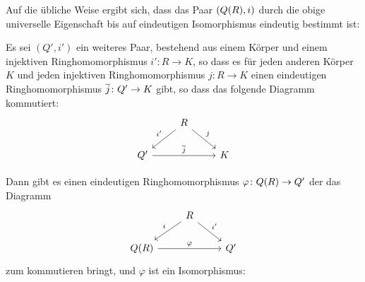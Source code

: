 \begin{remark}
  Auf die übliche Weise ergibt sich, dass das Paar $(Q(R), i)$ durch die obige universelle Eigenschaft bis auf eindeutigen Isomorphismus eindeutig bestimmt ist:
  
  Es sei $(Q', i')$ ein weiteres Paar, bestehend aus einem Körper und einem injektiven Ringhomomorphismus $i' \colon R \to K$, so dass es für jeden anderen Körper $K$ und jeden injektiven Ringhomomorphismus $j \colon R \to K$ einen eindeutigen Ringhomomorphismus $\overline{j} \colon Q' \to K$ gibt, so dass das folgende Diagramm kommutiert:
  \begin{equation}
    \begin{tikzcd}
        {}
      & R
        \arrow[swap]{dl}{i'}
        \arrow{dr}{j}
      & {}
      \\
        Q'
        \arrow{rr}{\induced{j}}
      & {}
      & K
    \end{tikzcd}
  \end{equation}
  
  Dann gibt es einen eindeutigen Ringhomomorphismus $\varphi \colon Q(R) \to Q'$ der das Diagramm
  \begin{equation}
    \label{equation: first morphism from uniqueness}
    \begin{tikzcd}
        {}
      & R
        \arrow[swap]{dl}{i}
        \arrow{dr}{i'}
      & {}
      \\
        \fraction{R}
        \arrow{rr}{\varphi}
      & {}
      & Q'
    \end{tikzcd}
  \end{equation}
  zum kommutieren bringt, und $\varphi$ ist ein Isomorphismus:
  

\end{remark}
